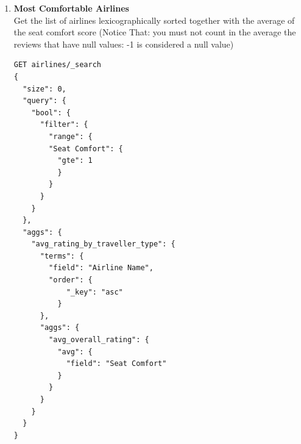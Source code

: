 \documentclass{Configuration_Files/PoliMi3i_thesis}
\begin{document}
\begin{enumerate}
\begin{figure}[H]
\end{figure}

\newpage
    \item \textbf{Most Comfortable Airlines} \\
    Get the list of airlines lexicographically sorted together with the average of the seat comfort score (Notice That: you must not count in the average the reviews that have null values: -1 is considered a null value)
    \begin{verbatim}
GET airlines/_search
{
  "size": 0,
  "query": {
    "bool": {
      "filter": {
        "range": {
        "Seat Comfort": {
          "gte": 1
          }
        }
      }
    }
  }, 
  "aggs": {
    "avg_rating_by_traveller_type": {
      "terms": {
        "field": "Airline Name",
        "order": {
            "_key": "asc"
          }
      },
      "aggs": {
        "avg_overall_rating": {
          "avg": {
            "field": "Seat Comfort"
          }
        }
      }
    }
  }
}
\end{verbatim}
\begin{figure}[H]
    \centering
    \quad
    \subfloat{
}
\end{figure}
\end{enumerate}
\end{document}
